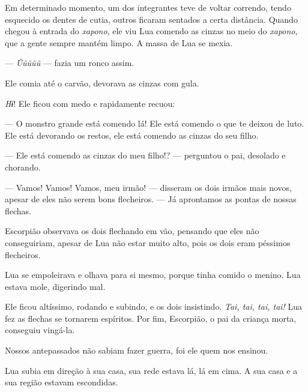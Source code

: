 Em determinado momento, um dos integrantes teve de voltar correndo,
tendo esquecido os dentes de cutia, outros ficaram sentados a certa
distância. Quando chegou à entrada do \textit{xapono}, ele viu Lua comendo as
cinzas no meio do \textit{xapono}, que a gente sempre mantém limpo. A massa de
Lua se mexia.

--- \textit{Ũũũũũ} --- fazia um ronco assim. 

Ele comia até o carvão, devorava as cinzas com gula. 

\textit{Hɨ}! Ele ficou com medo e rapidamente recuou: 


--- O monstro grande está comendo lá! Ele está comendo o que te deixou de
luto. Ele está devorando os restos, ele está comendo as cinzas
do seu filho. 

--- Ele está comendo as cinzas do meu filho!? --- perguntou o pai, desolado e
chorando. 

--- Vamos! Vamos! Vamos, meu irmão! --- disseram os dois irmãos mais
novos, apesar de eles não serem bons flecheiros. --- Já aprontamos as pontas de nossas flechas. 

Escorpião observava os dois flechando em vão, pensando que eles não
conseguiriam, apesar de Lua não estar muito alto, pois os dois eram
péssimos flecheiros. 

Lua se empoleirava e olhava para si mesmo, porque tinha comido o
menino. Lua estava mole, digerindo mal. 


Ele ficou altíssimo, rodando e subindo, e os dois insistindo. \textit{Tai,
tai, tai, tai!} Lua fez as flechas se tornarem espíritos. Por fim,
Escorpião, o pai da criança morta, conseguiu vingá-la. 

Nossos antepassados não sabiam fazer guerra, foi ele quem nos ensinou. 

Lua subia em direção à sua casa, sua rede estava lá, lá em cima. A sua
casa e a sua região estavam escondidas. 

